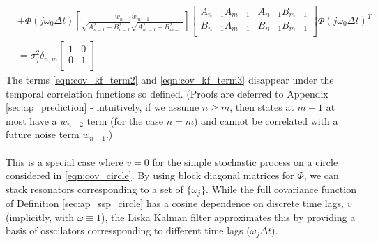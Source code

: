 \begin{align}
& +   \Phi(j \omega_0 \Delta t) \left[\frac{w_{n-1}w_{m-1}}{\sqrt{A_{n-1}^2 + B_{n-1}^2}\sqrt{A_{m-1}^2 + B_{m-1}^2}} \right]\begin{bmatrix} A_{n-1}A_{m-1} & A_{n-1}B_{m-1}\\ B_{n-1}A_{m-1} & B_{n-1}B_{m-1}\\ \end{bmatrix} \Phi(j \omega_0 \Delta t)^T \label{eqn:cov_kf_term3} \\
& = \sigma^2_j \delta_{n,m} \begin{bmatrix} 
1 & 0 \\ 
0 & 1  \\
\end{bmatrix} \label{eqn:cov_kf_term4}
\end{align}
The terms \ref{eqn:cov_kf_term2} and \ref{eqn:cov_kf_term3} disappear under the temporal correlation functions so defined. (Proofs are deferred to Appendix \ref{sec:ap_prediction} - intuitively, if we assume $n \geq m$, then states at $m-1$ at most have a $w_{n-2}$ term (for the case $n=m$) and cannot be correlated with a future noise term $w_{n-1}$.) 
\\
\\
This is a special case where $v=0$ for the simple stochastic process on a circle considered in \ref{eqn:cov_circle}. By using block diagonal matrices for $\Phi$, we can stack resonators corresponding to a set of $\{\omega_j\}$. While the full covariance function of  Definition \ref{sec:ap_ssp_circle} has a cosine dependence on discrete time lags, $v$ (implicitly, with $\omega \equiv 1$), the Liska Kalman filter approximates this by providing a basis of osscilators corressponding to different time lags ($\omega_j \Delta t$).
\\
\\

